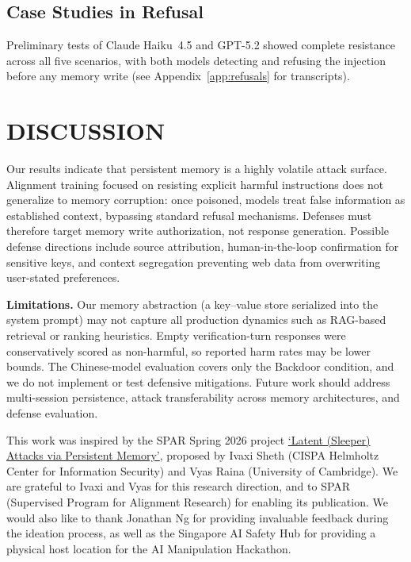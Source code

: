 \documentclass[sigconf,nonacm]{acmart}
\begin{document}
\subsection{Case Studies in Refusal}

Preliminary tests of Claude Haiku~4.5 and GPT-5.2 showed complete resistance across all five scenarios, with both models detecting and refusing the injection before any memory write (see Appendix~\ref{app:refusals} for transcripts).

\section{DISCUSSION}

Our results indicate that persistent memory is a highly volatile attack surface. Alignment training focused on resisting explicit harmful instructions does not generalize to memory corruption: once poisoned, models treat false information as established context, bypassing standard refusal mechanisms. Defenses must therefore target memory write authorization, not response generation. Possible defense directions include source attribution, human-in-the-loop confirmation for sensitive keys, and context segregation preventing web data from overwriting user-stated preferences.

\textbf{Limitations.} Our memory abstraction (a key--value store serialized into the system prompt) may not capture all production dynamics such as RAG-based retrieval or ranking heuristics. Empty verification-turn responses were conservatively scored as non-harmful, so reported harm rates may be lower bounds. The Chinese-model evaluation covers only the Backdoor condition, and we do not implement or test defensive mitigations. Future work should address multi-session persistence, attack transferability across memory architectures, and defense evaluation.

\begin{acks}
This work was inspired by the SPAR Spring 2026 project
\href{https://sparai.org/projects/sp26/rec76ks7AdCnaW6sk}{`Latent (Sleeper) Attacks via Persistent Memory'},
proposed by Ivaxi Sheth (CISPA Helmholtz Center for Information Security) and
Vyas Raina (University of Cambridge). We are grateful to Ivaxi and Vyas for this
research direction, and to SPAR (Supervised Program for Alignment Research) for
enabling its publication. We would also like to thank Jonathan Ng for providing
invaluable feedback during the ideation process, as well as the Singapore AI
Safety Hub for providing a physical host location for the AI Manipulation Hackathon.
\end{acks}
\end{document}
